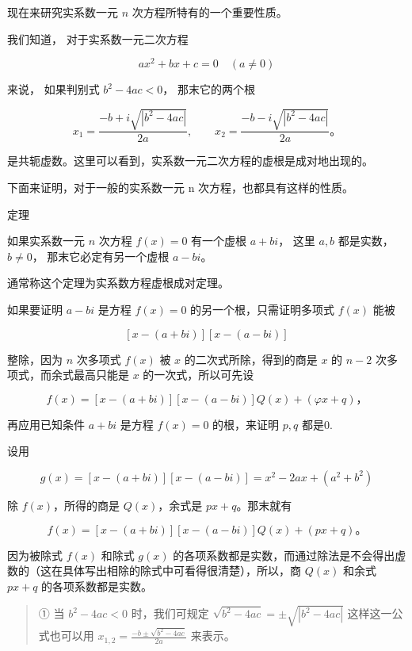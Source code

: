 现在来研究实系数一元 \(n\) 次方程所特有的一个重要性质。

我们知道， 对于实系数一元二次方程

\[
a x ^ {2} + b x + c = 0 \quad (a \neq 0)
\]

来说， 如果判别式 \(b^{2} - 4ac < 0\)， 那末它的两个根

\[
x_1=\frac{-b+i\sqrt{|b^2-4ac|}}{2a},\qquad x_2=\frac{-b-i\sqrt{|b^2-4ac|}}{2a}\text{。}
\]

是共轭虚数。这里可以看到，实系数一元二次方程的虚根是成对地出现的。

下面来证明，对于一般的实系数一元 n 次方程，也都具有这样的性质。

定理

如果实系数一元 \(n\) 次方程 \(f(x) = 0\) 有一个虚根 \(a+bi\)， 这里
\(a, b\) 都是实数， \(b \neq 0\)， 那末它必定有另一个虚根 \(a-bi\)。

通常称这个定理为实系数方程虚根成对定理。

如果要证明 \(a-bi\) 是方程 \(f(x) = 0\) 的另一个根，只需证明多项式
\(f(x)\) 能被

\[
[ x - (a + b i) ] [ x - (a - b i) ]
\]

整除，因为 \(n\) 次多项式 \(f(x)\) 被 \(x\) 的二次式所除，得到的商是
\(x\) 的 \(n - 2\) 次多项式，而余式最高只能是 \(x\) 的一次式，所以可先设

\[
f (x) = [ x - (a + b i) ] [ x - (a - b i) ] Q (x) + (\varphi x + q)\text{，}
\]

再应用已知条件 \(a + bi\) 是方程 \(f(x) = 0\) 的根，来证明 \(p, q\)
都是0.

 设用

\[
g (x) = [ x - (a + b i) ] [ x - (a - b i) ] = x ^ {2} - 2 a x + (a ^ {2} + b ^ {2})
\]

除 \(f(x)\)，所得的商是 \(Q(x)\)，余式是 \(px + q\)。那末就有

\[
f (x) = [ x - (a + b i) ] [ x - (a - b i) ] Q (x) + (p x + q)\text{。} \tag {1}
\]

因为被除式 \(f(x)\) 和除式 \(g(x)\)
的各项系数都是实数，而通过除法是不会得出虚数的（这在具体写出相除的除式中可看得很清楚），所以，商
\(Q(x)\) 和余式 \(px + q\) 的各项系数都是实数。

\begin{quote}
① 当 \(b^{2} - 4ac < 0\) 时，我们可规定
\(\sqrt{b^2 - 4ac} = \pm \sqrt{|b^2 - 4ac|}\) 这样这一公式也可以用
\(x_{1,2} = \frac{-b \pm \sqrt{b^2 - 4ac}}{2a}\) 来表示。
\end{quote}

